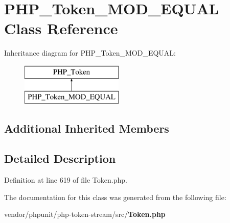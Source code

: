 \section{P\+H\+P\+\_\+\+Token\+\_\+\+M\+O\+D\+\_\+\+E\+Q\+U\+A\+L Class Reference}
\label{class_p_h_p___token___m_o_d___e_q_u_a_l}
Inheritance diagram for P\+H\+P\+\_\+\+Token\+\_\+\+M\+O\+D\+\_\+\+E\+Q\+U\+A\+L\+:\begin{figure}[H]
\begin{center}
\leavevmode
\includegraphics[height=2.000000cm]{class_p_h_p___token___m_o_d___e_q_u_a_l}
\end{center}
\end{figure}
\subsection*{Additional Inherited Members}


\subsection{Detailed Description}


Definition at line 619 of file Token.\+php.



The documentation for this class was generated from the following file\+:\begin{DoxyCompactItemize}
\item 
vendor/phpunit/php-\/token-\/stream/src/{\bf Token.\+php}\end{DoxyCompactItemize}
